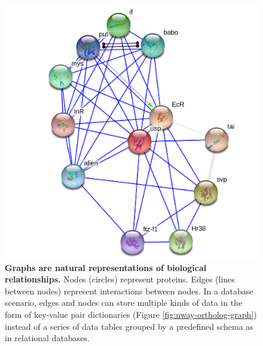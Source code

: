 
\begin{figure}[h]
\centering
\includegraphics[width=.6\textwidth]{figures/figs/EcRUSP_graph.png}

\caption[Graphs are natural representations of biological relationships]{\sf \textbf{Graphs are natural representations of biological relationships.} Nodes (circles) represent proteins.
Edges (lines between nodes) represent interactions between nodes.
In a database scenario, edges and nodes can store multiple kinds of data in the form of key-value pair dictionaries (Figure \ref{fig:nway-ortholog-graph}) instead of a series of data tables grouped by a predefined schema as in relational databases.
}
\label{fig:ecrusp-graph}
\end{figure}